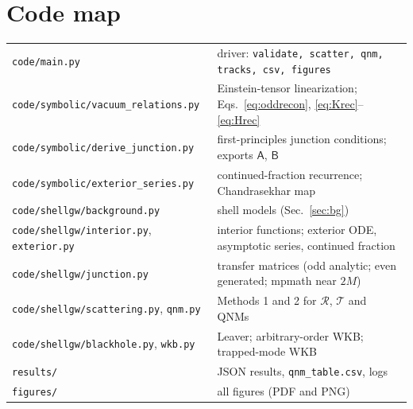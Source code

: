 \documentclass[11pt,a4paper]{article}
\numberwithin{equation}{section}
\begin{document}
\section{Code map}
{\small\begin{tabular}{p{6.3cm}p{9.3cm}}
\texttt{code/main.py} & driver: \texttt{validate, scatter, qnm, tracks, csv, figures}\\
\texttt{code/symbolic/vacuum\_relations.py} & Einstein-tensor linearization; Eqs.~\eqref{eq:oddrecon}, \eqref{eq:Krec}--\eqref{eq:Hrec}\\
\texttt{code/symbolic/derive\_junction.py} & first-principles junction conditions; exports $\mathsf A$, $\mathsf B$\\
\texttt{code/symbolic/exterior\_series.py} & continued-fraction recurrence; Chandrasekhar map\\
\texttt{code/shellgw/background.py} & shell models (Sec.~\ref{sec:bg})\\
\texttt{code/shellgw/interior.py}, \texttt{exterior.py} & interior functions; exterior ODE, asymptotic series, continued fraction\\
\texttt{code/shellgw/junction.py} & transfer matrices (odd analytic; even generated; mpmath near $2M$)\\
\texttt{code/shellgw/scattering.py}, \texttt{qnm.py} & Methods 1 and 2 for $\mathcal R$, $\mathcal T$ and QNMs\\
\texttt{code/shellgw/blackhole.py}, \texttt{wkb.py} & Leaver; arbitrary-order WKB; trapped-mode WKB\\
\texttt{results/} & JSON results, \texttt{qnm\_table.csv}, logs\\
\texttt{figures/} & all figures (PDF and PNG)
\end{tabular}}
\end{document}
